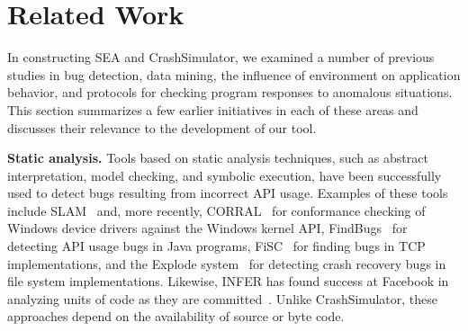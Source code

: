 \section{Related Work}
\label{SEC:related-work}

In constructing SEA and CrashSimulator, we examined a number of previous
studies in bug detection, data mining, the influence of environment on
application behavior, and protocols for checking program responses to anomalous
situations. This section
summarizes a few earlier initiatives in each of these areas and discusses
their relevance to the development of our tool.



\iffalse
While there is a vast amount of literature on test
generation~\cite{ammann2008introduction, mcminn2004search,
  puasuareanu2009survey, dias2007survey}, much less work
has focused on issues of portability, and tests of whether software
behaves consistently in different environments.  Prior work on
CheckAPI~\cite{rasley2015detecting} and
NetCheck~\cite{Zhuang_NSDI_2014} begins to fill this gap and this paper
builds upon those results.
%
%


Crash reproduction by test case mutation~\cite{DBLP:conf/sigsoft/XuanXM15}.

\fi


\noindent
{\bf Static analysis. }
\label{rel-static-analysis}
Tools based on static analysis techniques, such as abstract interpretation,
model checking, and symbolic execution, have been successfully
used to
detect bugs resulting from incorrect API usage. Examples of these tools
include
SLAM~\cite{Ball_adecade, Ball:2002:SLP:503272.503274} and, more recently,
CORRAL~\cite{DBLP:conf/sigsoft/LalQ14} for conformance checking of Windows
device drivers against the Windows kernel API,
FindBugs~\cite{DBLP:conf/oopsla/HovemeyerP04} for detecting API usage bugs
in Java programs, FiSC~\cite{Musuvathi04modelchecking} for finding bugs in
TCP implementations, and the Explode
system~\cite{Yang:2006:ELG:1298455.1298469} for detecting crash recovery
bugs in file system implementations.  Likewise, INFER has found success at
Facebook in analyzing units of code as they are
committed~\cite{INFERFacebook}. Unlike CrashSimulator, these
approaches depend on the availability of source or byte code.

